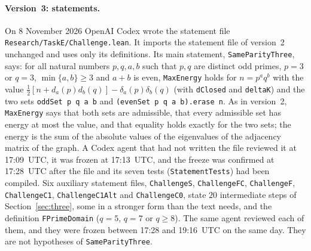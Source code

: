 \documentclass[11pt]{article}
\theoremstyle{remark}
\begin{document}
\paragraph{Version~3: statements.}
On 8 November 2026 OpenAI Codex wrote the statement file
\texttt{Research/TaskE/Challenge.lean}. It imports the statement file of version~2
unchanged and uses only its definitions. Its main statement,
\texttt{SameParityThree}, says: for all natural numbers $p,q,a,b$ such that $p,q$
are distinct odd primes, $p=3$ or $q=3$, $\min\{a,b\}\ge3$ and $a+b$ is even,
\texttt{MaxEnergy} holds for $n=p^aq^b$ with the value
$\frac12[n+d_a(p)d_b(q)]-\delta_a(p)\delta_b(q)$ (with \texttt{dClosed} and
\texttt{deltaK}) and the two sets \texttt{oddSet p q a b} and
\texttt{(evenSet p q a b).erase n}. As in version~2, \texttt{MaxEnergy} says that
both sets are admissible, that every admissible set has energy at most the value,
and that equality holds exactly for the two sets; the energy is the sum of the
absolute values of the eigenvalues of the adjacency matrix of the graph. A Codex
agent that had not written the file reviewed it at 17:09~UTC, it was frozen at
17:13~UTC, and the freeze was confirmed at
17:28~UTC after the file and its seven tests (\texttt{StatementTests}) had been
compiled. Six auxiliary statement files, \texttt{ChallengeS}, \texttt{ChallengeFC},
\texttt{ChallengeF}, \texttt{ChallengeC1}, \texttt{ChallengeC1Alt} and
\texttt{ChallengeC0}, state $20$ intermediate steps of Section~\ref{sec:three}, some
in a stronger form than the text needs, and the definition \texttt{FPrimeDomain}
($q=5$, $q=7$ or $q\ge8$). The same agent reviewed each of them, and they were
frozen between 17:28 and 19:16~UTC on the same day. They are not hypotheses of
\texttt{SameParityThree}.
\end{document}

